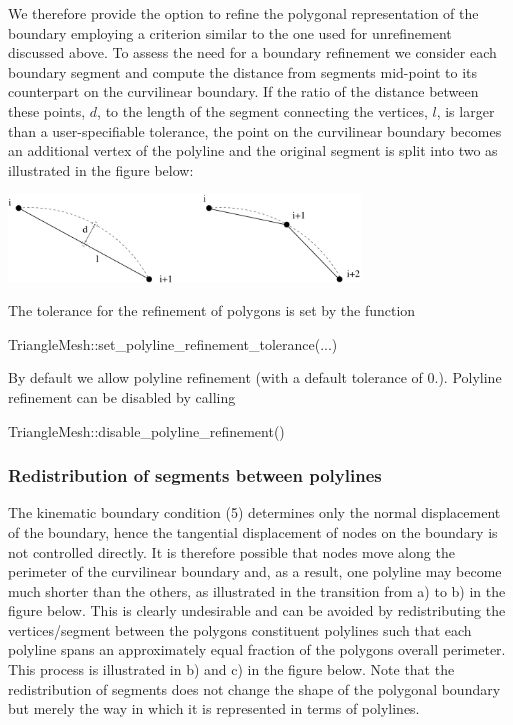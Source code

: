 We therefore provide the option to refine the polygonal representation of the boundary employing a criterion similar to the one used for unrefinement discussed above. To assess the need for a boundary refinement we consider each boundary segment and compute the distance from segment\textquotesingle{}s mid-\/point to its counterpart on the curvilinear boundary. If the ratio of the distance between these points, $ d $, to the length of the segment connecting the vertices, $ l $, is larger than a user-\/specifiable tolerance, the point on the curvilinear boundary becomes an additional vertex of the polyline and the original segment is split into two as illustrated in the figure below\+:

 
\begin{DoxyImage}
\includegraphics[width=0.7\textwidth]{refinement}
\end{DoxyImage}


The tolerance for the refinement of polygons is set by the function


\begin{DoxyCode}
TriangleMesh::set\_polyline\_refinement\_tolerance(...)
\end{DoxyCode}


By default we allow polyline refinement (with a default tolerance of 0.). Polyline refinement can be disabled by calling


\begin{DoxyCode}
TriangleMesh::disable\_polyline\_refinement()
\end{DoxyCode}
\hypertarget{index_redistribution}{}\subsubsection{Redistribution of segments between polylines}\label{index_redistribution}
The kinematic boundary condition (5) determines only the normal displacement of the boundary, hence the tangential displacement of nodes on the boundary is not controlled directly. It is therefore possible that nodes move along the perimeter of the curvilinear boundary and, as a result, one polyline may become much shorter than the others, as illustrated in the transition from a) to b) in the figure below. This is clearly undesirable and can be avoided by redistributing the vertices/segment between the polygon\textquotesingle{}s constituent polylines such that each polyline spans an approximately equal fraction of the polygon\textquotesingle{}s overall perimeter. This process is illustrated in b) and c) in the figure below. Note that the redistribution of segments does not change the shape of the polygonal boundary but merely the way in which it is represented in terms of polylines.

